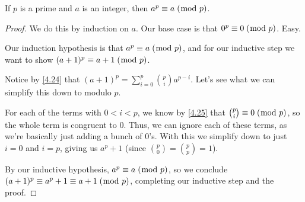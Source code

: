 \documentclass[../main.tex]{subfiles}
\begin{document}
\begin{thm} \label{4.26}
  If $p$ is a prime and $a$ is an integer, then $a^p \equiv a \; (\bmod \; p)$.
\end{thm}

\begin{proof}
  We do this by induction on $a$. Our base case is that $0^p \equiv 0 \; (\bmod \; p)$. Easy.

  Our induction hypothesis is that $a^p \equiv a \; (\bmod \; p)$, and for our inductive step we want to show $(a+1)^p \equiv a+1 \; (\bmod \; p)$.

  Notice by \ref{4.24} that $(a + 1)^p = \sum_{i=0}^p \binom{p}{i}a^{p-i}$. Let's see what we can simplify this down to modulo $p$.

  For each of the terms with $0 < i < p$, we know by \ref{4.25} that $\binom{p}{i} \equiv 0 \; (\bmod \; p)$, so the whole term is congruent to $0$. Thus, we can ignore each of these terms, as we're basically just adding a bunch of $0$'s. With this we simplify down to just $i = 0$ and $i = p$, giving us $a^p + 1$ (since $\binom{p}{0} = \binom{p}{p} = 1$).

  By our inductive hypothesis, $a^p \equiv a \; (\bmod \; p)$, so we conclude $(a+1)^p \equiv a^p + 1 \equiv a + 1 \; (\bmod \; p)$, completing our inductive step and the proof.
\end{proof}
\end{document}
